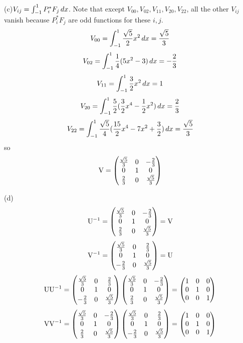 \documentclass[a4paper]{article}
\begin{document}
(c)$V_{ij}=\int_{-1}^1P_i^*F_j\,dx$. Note that except $V_{00},V_{02},V_{11},V_{20},V_{22}$, all the other $V_{ij}$ vanish because $P_i^*F_j$ are odd functions for these $i,j$.
\[
V_{00}=\int_{-1}^1\frac{\sqrt{5}}{2}x^2\,dx=\frac{\sqrt{5}}{3}
\]
\[
V_{02}=\int_{-1}^1\frac{1}{4}(5x^2-3)\,dx=-\frac{2}{3}
\]
\[
V_{11}=\int_{-1}^1\frac{3}{2}x^2\,dx=1
\]
\[
V_{20}=\int_{-1}^1\frac{5}{2}(\frac{3}{2}x^4-\frac{1}{2}x^2)\,dx=\frac{2}{3}
\]
\[
V_{22}=\int_{-1}^1\frac{\sqrt{5}}{4}(\frac{15}{2}x^4-7x^2+\frac{3}{2})\,dx=\frac{\sqrt{5}}{3}
\]
so
\[
\mathrm{V}=
\begin{pmatrix}
\frac{\sqrt{5}}{3}&0&-\frac{2}{3}\\
0&1&0\\
\frac{2}{3}&0&\frac{\sqrt{5}}{3}
\end{pmatrix}
\]

(d)
\[
\mathrm{U}^{-1}=\begin{pmatrix}
\frac{\sqrt{5}}{3}&0&-\frac{2}{3}\\
0&1&0\\
\frac{2}{3}&0&\frac{\sqrt{5}}{3}
\end{pmatrix}=\mathrm{V}
\]
\[
\mathrm{V}^{-1}=\begin{pmatrix}
\frac{\sqrt{5}}{3}&0&\frac{2}{3}\\
0&1&0\\
-\frac{2}{3}&0&\frac{\sqrt{5}}{3}
\end{pmatrix}=\mathrm{U}
\]
\[
\mathrm{U}\mathrm{U}^{-1}=\begin{pmatrix}
\frac{\sqrt{5}}{3}&0&\frac{2}{3}\\
0&1&0\\
-\frac{2}{3}&0&\frac{\sqrt{5}}{3}
\end{pmatrix}
\begin{pmatrix}
\frac{\sqrt{5}}{3}&0&-\frac{2}{3}\\
0&1&0\\
\frac{2}{3}&0&\frac{\sqrt{5}}{3}
\end{pmatrix}=
\begin{pmatrix}
1&0&0\\
0&1&0\\
0&0&1
\end{pmatrix}
\]
\[
\mathrm{V}\mathrm{V}^{-1}=\begin{pmatrix}
\frac{\sqrt{5}}{3}&0&-\frac{2}{3}\\
0&1&0\\
\frac{2}{3}&0&\frac{\sqrt{5}}{3}
\end{pmatrix}
\begin{pmatrix}
\frac{\sqrt{5}}{3}&0&\frac{2}{3}\\
0&1&0\\
-\frac{2}{3}&0&\frac{\sqrt{5}}{3}
\end{pmatrix}=
\begin{pmatrix}
1&0&0\\
0&1&0\\
0&0&1
\end{pmatrix}
\]
\end{document}
